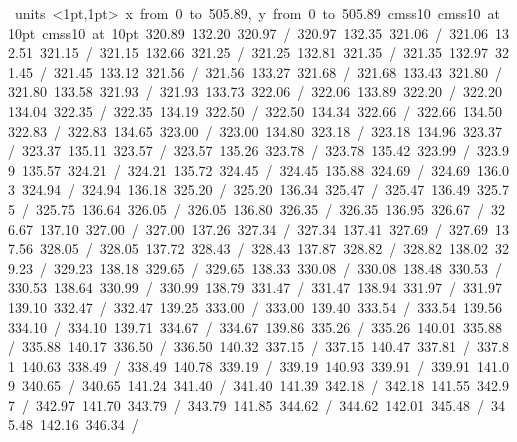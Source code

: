 \hbox{\beginpicture
\setcoordinatesystem units <1pt,1pt>
\setplotarea x from 0 to 505.89, y from 0 to 505.89
\setlinear
\font\picfont cmss10\picfont
\font\picfont cmss10 at 10pt\picfont
\font\picfont cmss10 at 10pt\picfont
\setsolid
{} 320.89 132.20 320.97 /
 320.97 132.35 321.06 /
 321.06 132.51 321.15 /
 321.15 132.66 321.25 /
 321.25 132.81 321.35 /
 321.35 132.97 321.45 /
 321.45 133.12 321.56 /
 321.56 133.27 321.68 /
 321.68 133.43 321.80 /
 321.80 133.58 321.93 /
 321.93 133.73 322.06 /
 322.06 133.89 322.20 /
 322.20 134.04 322.35 /
 322.35 134.19 322.50 /
 322.50 134.34 322.66 /
 322.66 134.50 322.83 /
 322.83 134.65 323.00 /
 323.00 134.80 323.18 /
 323.18 134.96 323.37 /
 323.37 135.11 323.57 /
 323.57 135.26 323.78 /
 323.78 135.42 323.99 /
 323.99 135.57 324.21 /
 324.21 135.72 324.45 /
 324.45 135.88 324.69 /
 324.69 136.03 324.94 /
 324.94 136.18 325.20 /
 325.20 136.34 325.47 /
 325.47 136.49 325.75 /
 325.75 136.64 326.05 /
 326.05 136.80 326.35 /
 326.35 136.95 326.67 /
 326.67 137.10 327.00 /
 327.00 137.26 327.34 /
 327.34 137.41 327.69 /
 327.69 137.56 328.05 /
 328.05 137.72 328.43 /
 328.43 137.87 328.82 /
 328.82 138.02 329.23 /
 329.23 138.18 329.65 /
 329.65 138.33 330.08 /
 330.08 138.48 330.53 /
 330.53 138.64 330.99 /
 330.99 138.79 331.47 /
 331.47 138.94 331.97 /
 331.97 139.10 332.47 /
 332.47 139.25 333.00 /
 333.00 139.40 333.54 /
 333.54 139.56 334.10 /
 334.10 139.71 334.67 /
 334.67 139.86 335.26 /
 335.26 140.01 335.88 /
 335.88 140.17 336.50 /
 336.50 140.32 337.15 /
 337.15 140.47 337.81 /
 337.81 140.63 338.49 /
 338.49 140.78 339.19 /
 339.19 140.93 339.91 /
 339.91 141.09 340.65 /
 340.65 141.24 341.40 /
 341.40 141.39 342.18 /
 342.18 141.55 342.97 /
 342.97 141.70 343.79 /
 343.79 141.85 344.62 /
 344.62 142.01 345.48 /
 345.48 142.16 346.34 /
}
